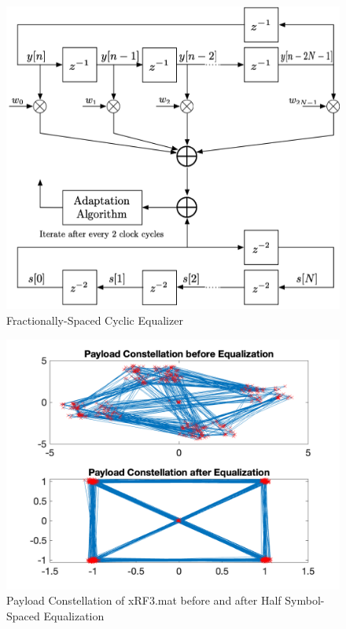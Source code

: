 \begin{figure}[h!]
    \centering
    \includegraphics[scale=0.4]{figures/cyclic-frac.png}
    \caption{Fractionally-Spaced Cyclic Equalizer}
    \label{fig:cyclic-frac}
\end{figure}
\begin{figure}[h!]
    \centering
    \includegraphics[scale=0.4]{figures/payload_constellation_part3.png}
    \caption{Payload Constellation of xRF3.mat before and after Half Symbol-Spaced Equalization}
    \label{fig:payload-equal-part3}
\end{figure}

